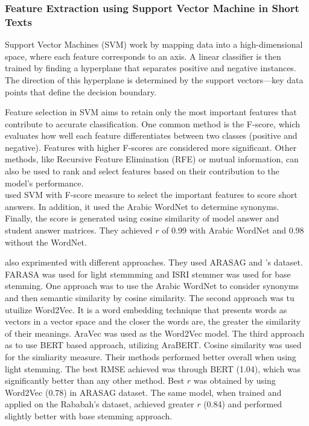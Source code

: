 \documentclass{article}
\begin{document}
\subsubsection{Feature Extraction using Support Vector Machine in Short Texts}
Support Vector Machines (SVM) work by mapping data into a high-dimensional space, where each feature corresponds to an axis. A linear classifier is then trained by finding a hyperplane that separates positive and negative instances. The direction of this hyperplane is determined by the support vectors—key data points that define the decision boundary.

Feature selection in SVM aims to retain only the most important features that contribute to accurate classification. One common method is the F-score, which evaluates how well each feature differentiates between two classes (positive and negative). Features with higher F-scores are considered more significant. Other methods, like Recursive Feature Elimination (RFE) or mutual information, can also be used to rank and select features based on their contribution to the model's performance. \\ 

\textbf{\textcite{4_abdeljaber2021wordnet}} used SVM with F-score measure to select the important features to score short answers. In addition, it used the Arabic WordNet to determine synonyms. Finally, the score is generated using cosine similarity of model answer and student answer matrices. They achieved $r$ of 0.99 with Arabic WordNet and 0.98 without the WordNet.

\textbf{\textcite{22_meccawy2023mining}} also exprimented with different approaches. They used ARASAG and \textcite{16_rababah2017short}'s dataset. FARASA was used for light stemmming and ISRI stemmer was used for base stemming. One approach was to use the Arabic WordNet to consider synonyms and then semantic similarity by cosine similarity. The second approach was tu utuilize Word2Vec. It is a word embedding technique that presents words as vectors in a vector space and the closer the words are, the greater the similarity of their meanings. AraVec was used as the Word2Vec model. The third approach as to use BERT based approach, utilizing AraBERT. Cosine similarity was used for the simliarity measure. Their methods performed better overall when using light stemming. The best RMSE achieved was through BERT (1.04), which was significantly better than any other method. Best $r$ was obtained by using Word2Vec (0.78) in ARASAG dataset. The same model, when trained and applied on the Rababah's dataset, achieved greater $r$ (0.84) and performed slightly better with base stemming approach. \\
\end{document}

